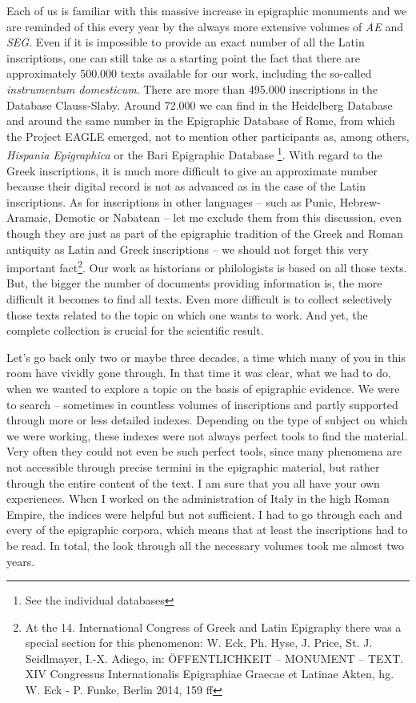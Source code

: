 \documentclass[amsthm,ebook]{saparticle}
\begin{document}
Each of us is familiar with this massive increase in epigraphic monuments and we 
are reminded of this every year by the always more extensive volumes of \textit{AE} and \textit{SEG}. Even if it is impossible to provide an exact number of all the 
Latin inscriptions, one can still take as a starting point the fact that there 
are approximately 500.000 texts available for our work, including the so-called 
\textit{instrumentum domesticum}. There are more than 495.000 inscriptions in the 
Database Clauss-Slaby. Around 72.000 we can find in the Heidelberg Database and 
around the same number in the Epigraphic Database of Rome, from which the Project 
EAGLE emerged, not to mention other participants as, among others, \textit{Hispania 
Epigraphica }or the Bari Epigraphic Database \footnote{See the individual databases}. With regard to the Greek inscriptions, 
it is much more difficult to give an approximate number because their digital record 
is not as advanced as in the case of the Latin inscriptions. As for inscriptions 
in other languages – such as Punic, Hebrew-Aramaic, Demotic or Nabatean – let 
me exclude them from this discussion, even though they are just as part of the 
epigraphic tradition of the Greek and Roman antiquity as Latin and Greek inscriptions 
– we should not forget this very important fact\footnote{\label{fn:7}At the 14. International Congress of Greek and Latin Epigraphy there was a special section for this phenomenon: W. Eck, Ph. Hyse, J. Price, St. J. Seidlmayer, I.-X. Adiego, in: ÖFFENTLICHKEIT – MONUMENT – TEXT. XIV Congressus Internationalis Epigraphiae Graecae et Latinae Akten, hg. W. Eck - P. Funke, Berlin 2014, 159 ff}. Our work as historians or philologists 
is based on all those texts. But, the bigger the number of documents providing 
information is, the more difficult it becomes to find all texts. Even more difficult 
is to collect selectively those texts related to the topic on which one wants to 
work. And yet, the complete collection is crucial for the scientific result.

Let's go back only two or maybe three decades, a time which many of you in this 
room have vividly gone through. In that time it was clear, what we had to do, when 
we wanted to explore a topic on the basis of epigraphic evidence. We were to search 
– sometimes in countless volumes of inscriptions and partly supported through 
more or less detailed indexes. Depending on the type of subject on which we were 
working, these indexes were not always perfect tools to find the material. Very 
often they could not even be such perfect tools, since many phenomena are not accessible 
through precise termini in the epigraphic material, but rather through the entire 
content of the text. I am sure that you all have your own experiences. When I worked 
on the administration of Italy in the high Roman Empire, the indices were helpful 
but not sufficient. I had to go through each and every of the epigraphic corpora, 
which means that at least the inscriptions had to be read. In total, the look through 
all the necessary volumes took me almost two years. 
\end{document}
